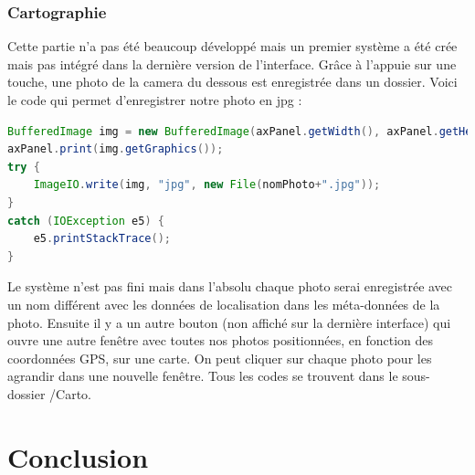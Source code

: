 \documentclass[a4paper,11pt]{report}
\begin{document}
		\subsection{Cartographie}
			\label{subsec:Cartographie}
			Cette partie n'a pas été beaucoup développé mais un premier système a été crée mais pas intégré dans la dernière version de l'interface.
			\newline Grâce à l'appuie sur une touche, une photo de la camera du dessous est enregistrée dans un dossier. Voici le code qui permet d'enregistrer notre photo en jpg :
			\begin{lstlisting}[language=java]
BufferedImage img = new BufferedImage(axPanel.getWidth(), axPanel.getHeight(), BufferedImage.TYPE_INT_RGB);
axPanel.print(img.getGraphics());
try {
	ImageIO.write(img, "jpg", new File(nomPhoto+".jpg"));
}
catch (IOException e5) {
	e5.printStackTrace();
}
		\end{lstlisting}
			Le système n'est pas fini mais dans l'absolu chaque photo serai enregistrée avec un nom différent avec les données de localisation dans les méta-données de la photo.
			\newline Ensuite il y a un autre bouton (non affiché sur la dernière interface) qui ouvre une autre fenêtre avec toutes nos photos positionnées, en fonction des coordonnées GPS, sur une carte.
			\newline On peut cliquer sur chaque photo pour les agrandir dans une nouvelle fenêtre.
			\newline Tous les codes se trouvent dans le sous-dossier /Carto.
			
\chapter{Conclusion}



\listoffigures
\end{document}
